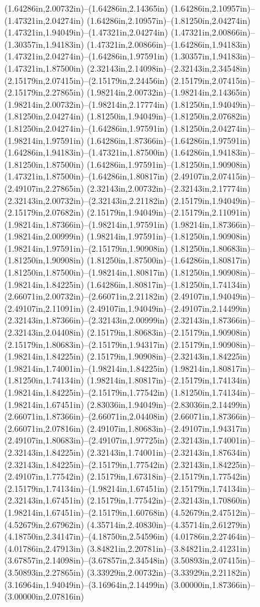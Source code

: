 (1.64286in,2.00732in)--(1.64286in,2.14365in) (1.64286in,2.10957in)--(1.47321in,2.04274in) (1.64286in,2.10957in)--(1.81250in,2.04274in) (1.47321in,1.94049in)--(1.47321in,2.04274in) (1.47321in,2.00866in)--(1.30357in,1.94183in) (1.47321in,2.00866in)--(1.64286in,1.94183in) (1.47321in,2.04274in)--(1.64286in,1.97591in) (1.30357in,1.94183in)--(1.47321in,1.87500in) (2.32143in,2.14098in)--(2.32143in,2.34548in) (2.15179in,2.07415in)--(2.15179in,2.24456in) (2.15179in,2.07415in)--(2.15179in,2.27865in) (1.98214in,2.00732in)--(1.98214in,2.14365in) (1.98214in,2.00732in)--(1.98214in,2.17774in) (1.81250in,1.94049in)--(1.81250in,2.04274in) (1.81250in,1.94049in)--(1.81250in,2.07682in) (1.81250in,2.04274in)--(1.64286in,1.97591in) (1.81250in,2.04274in)--(1.98214in,1.97591in) (1.64286in,1.87366in)--(1.64286in,1.97591in) (1.64286in,1.94183in)--(1.47321in,1.87500in) (1.64286in,1.94183in)--(1.81250in,1.87500in) (1.64286in,1.97591in)--(1.81250in,1.90908in) (1.47321in,1.87500in)--(1.64286in,1.80817in) (2.49107in,2.07415in)--(2.49107in,2.27865in) (2.32143in,2.00732in)--(2.32143in,2.17774in) (2.32143in,2.00732in)--(2.32143in,2.21182in) (2.15179in,1.94049in)--(2.15179in,2.07682in) (2.15179in,1.94049in)--(2.15179in,2.11091in) (1.98214in,1.87366in)--(1.98214in,1.97591in) (1.98214in,1.87366in)--(1.98214in,2.00999in) (1.98214in,1.97591in)--(1.81250in,1.90908in) (1.98214in,1.97591in)--(2.15179in,1.90908in) (1.81250in,1.80683in)--(1.81250in,1.90908in) (1.81250in,1.87500in)--(1.64286in,1.80817in) (1.81250in,1.87500in)--(1.98214in,1.80817in) (1.81250in,1.90908in)--(1.98214in,1.84225in) (1.64286in,1.80817in)--(1.81250in,1.74134in) (2.66071in,2.00732in)--(2.66071in,2.21182in) (2.49107in,1.94049in)--(2.49107in,2.11091in) (2.49107in,1.94049in)--(2.49107in,2.14499in) (2.32143in,1.87366in)--(2.32143in,2.00999in) (2.32143in,1.87366in)--(2.32143in,2.04408in) (2.15179in,1.80683in)--(2.15179in,1.90908in) (2.15179in,1.80683in)--(2.15179in,1.94317in) (2.15179in,1.90908in)--(1.98214in,1.84225in) (2.15179in,1.90908in)--(2.32143in,1.84225in) (1.98214in,1.74001in)--(1.98214in,1.84225in) (1.98214in,1.80817in)--(1.81250in,1.74134in) (1.98214in,1.80817in)--(2.15179in,1.74134in) (1.98214in,1.84225in)--(2.15179in,1.77542in) (1.81250in,1.74134in)--(1.98214in,1.67451in) (2.83036in,1.94049in)--(2.83036in,2.14499in) (2.66071in,1.87366in)--(2.66071in,2.04408in) (2.66071in,1.87366in)--(2.66071in,2.07816in) (2.49107in,1.80683in)--(2.49107in,1.94317in) (2.49107in,1.80683in)--(2.49107in,1.97725in) (2.32143in,1.74001in)--(2.32143in,1.84225in) (2.32143in,1.74001in)--(2.32143in,1.87634in) (2.32143in,1.84225in)--(2.15179in,1.77542in) (2.32143in,1.84225in)--(2.49107in,1.77542in) (2.15179in,1.67318in)--(2.15179in,1.77542in) (2.15179in,1.74134in)--(1.98214in,1.67451in) (2.15179in,1.74134in)--(2.32143in,1.67451in) (2.15179in,1.77542in)--(2.32143in,1.70860in) (1.98214in,1.67451in)--(2.15179in,1.60768in) (4.52679in,2.47512in)--(4.52679in,2.67962in) (4.35714in,2.40830in)--(4.35714in,2.61279in) (4.18750in,2.34147in)--(4.18750in,2.54596in) (4.01786in,2.27464in)--(4.01786in,2.47913in) (3.84821in,2.20781in)--(3.84821in,2.41231in) (3.67857in,2.14098in)--(3.67857in,2.34548in) (3.50893in,2.07415in)--(3.50893in,2.27865in) (3.33929in,2.00732in)--(3.33929in,2.21182in) (3.16964in,1.94049in)--(3.16964in,2.14499in) (3.00000in,1.87366in)--(3.00000in,2.07816in) 